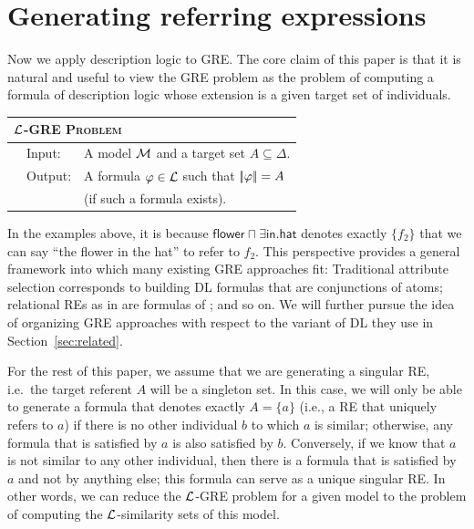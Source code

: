 \section{Generating referring expressions} \label{sec:gre}

Now we apply description logic to GRE.  The core claim of this paper
is that it is natural and useful to view the GRE problem as the
problem of computing a formula of description logic whose extension is
a given target set of individuals.

\medskip
\noindent
{\small
\begin{center}
\begin{tabular}{ll} \hline
\multicolumn{2}{l}{
\textsc{$\mathcal{L}$-GRE Problem}}\\ \hline
\ \ Input: & A model $\mathcal{M}$ and a target set $A \subseteq \Delta$.\\
\ \ Output: & A formula $\varphi \in \mathcal{L}$ such that
$|\!|\varphi|\!| = A$\\ 
& \hspace*{0.5cm} (if such a formula exists).\\ \hline
\end{tabular}
\end{center}}
\medskip

In the examples above, it is because $\mathsf{flower} \sqcap \exists
\mathsf{in}. \mathsf{hat}$ denotes exactly $\{f_2\}$ that we can say
``the flower in the hat'' to refer to $f_2$.  This perspective
provides a general framework into which many existing GRE approaches
fit: Traditional attribute selection \cite{Dale1995} corresponds to
building DL formulas that are conjunctions of atoms; relational REs as
in  are formulas of
\el; and so on.  We will further pursue the idea of organizing GRE
approaches with respect to the variant of DL they use in
Section~\ref{sec:related}.

For the rest of this paper, we assume that we are generating a
singular RE, i.e.\ the target referent $A$ will be a singleton set.
In this case, we will only be able to generate a formula that denotes
exactly $A = \{a\}$ (i.e., a RE that uniquely refers to $a$) if there
is no other individual $b$ to which $a$ is similar; otherwise, any
formula that is satisfied by $a$ is also satisfied by $b$.
Conversely, if we know that $a$ is not similar to any other
individual, then there is a formula that is satisfied by $a$ and not
by anything else; this formula can serve as a unique singular RE.  In
other words, we can reduce the $\mathcal{L}$-GRE problem for a given model to
the problem of computing the $\mathcal{L}$-similarity sets of this model.

